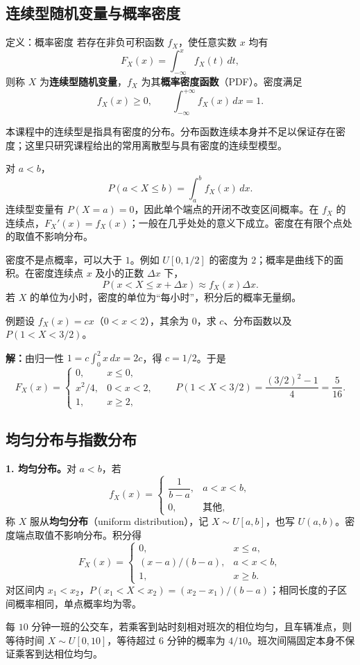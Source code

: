\documentclass[UTF8,fontset=none,zihao=-4,a4paper]{ctexart}
\newcommand{\term}[1]{\textbf{#1}}
\newcommand{\example}[1]{\begin{infobox}{例题}#1\end{infobox}}
\newcommand{\solution}{\par\noindent\textbf{解：}}
\begin{document}
\subsection{连续型随机变量与概率密度}
\begin{infobox}{定义：概率密度}
若存在非负可积函数 $f_X$，使任意实数 $x$ 均有
\[
F_X(x)=\int_{-\infty}^{x}f_X(t)\,dt,
\]
则称 $X$ 为\term{连续型随机变量}，$f_X$ 为其\term{概率密度函数}（PDF）。密度满足
\[
f_X(x)\ge0,\qquad \int_{-\infty}^{+\infty}f_X(x)\,dx=1.
\]
\end{infobox}
本课程中的连续型是指具有密度的分布。分布函数连续本身并不足以保证存在密度；这里只研究课程给出的常用离散型与具有密度的连续型模型。

对 $a<b$，
\[
P(a<X\le b)=\int_a^b f_X(x)\,dx.
\]
连续型变量有 $P(X=a)=0$，因此单个端点的开闭不改变区间概率。在 $f_X$ 的连续点，$F_X'(x)=f_X(x)$；一般在几乎处处的意义下成立。密度在有限个点处的取值不影响分布。

密度不是点概率，可以大于 $1$。例如 $U[0,1/2]$ 的密度为 $2$；概率是曲线下的面积。在密度连续点 $x$ 及小的正数 $\Delta x$ 下，
\[
P(x<X\le x+\Delta x)\approx f_X(x)\Delta x.
\]
若 $X$ 的单位为小时，密度的单位为“每小时”，积分后的概率无量纲。
\example{设 $f_X(x)=cx$（$0<x<2$），其余为 $0$，求 $c$、分布函数以及 $P(1<X<3/2)$。}
\solution 由归一性 $1=c\int_0^2x\,dx=2c$，得 $c=1/2$。于是
\[
F_X(x)=\begin{cases}0,&x\le0,\\x^2/4,&0<x<2,\\1,&x\ge2,\end{cases}
\qquad P(1<X<3/2)=\frac{(3/2)^2-1}{4}=\frac5{16}.
\]

\subsection{均匀分布与指数分布}
\textbf{1. 均匀分布。}对 $a<b$，若
\[
f_X(x)=\begin{cases}\dfrac1{b-a},&a<x<b,\\0,&\text{其他},\end{cases}
\]
称 $X$ 服从\term{均匀分布}（uniform distribution），记 $X\sim U[a,b]$，也写 $U(a,b)$。密度端点取值不影响分布。积分得
\[
F_X(x)=\begin{cases}0,&x\le a,\\(x-a)/(b-a),&a<x<b,\\1,&x\ge b.\end{cases}
\]
对区间内 $x_1<x_2$，$P(x_1<X<x_2)=(x_2-x_1)/(b-a)$；相同长度的子区间概率相同，单点概率均为零。

每 $10$ 分钟一班的公交车，若乘客到站时刻相对班次的相位均匀，且车辆准点，则等待时间 $X\sim U[0,10]$，等待超过 $6$ 分钟的概率为 $4/10$。班次间隔固定本身不保证乘客到达相位均匀。
\end{document}
